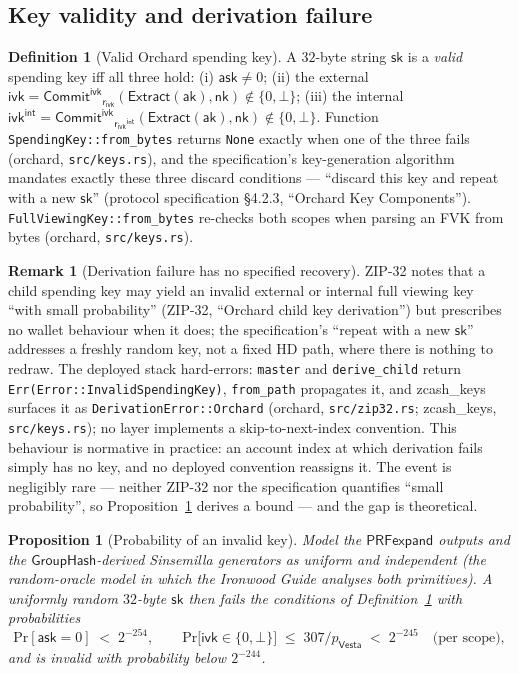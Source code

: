 \documentclass[11pt,a4paper]{article}
\newtheorem{proposition}[theorem]{Proposition}
\theoremstyle{definition}
\newtheorem{definition}[theorem]{Definition}
\newtheorem{remark}[theorem]{Remark}
\renewcommand{\Pr}{\mathrm{Pr}}
\newcommand{\Vesta}{\ensuremath{\mathsf{Vesta}}}
\newcommand{\CommitIvk}{\ensuremath{\mathsf{Commit}^{\mathsf{ivk}}}}
\newcommand{\Extract}{\ensuremath{\mathsf{Extract}}}
\newcommand{\GroupHash}{\ensuremath{\mathsf{GroupHash}}}
\newcommand{\ask}{\ensuremath{\mathsf{ask}}}
\newcommand{\aksym}{\ensuremath{\mathsf{ak}}}
\newcommand{\nksym}{\ensuremath{\mathsf{nk}}}
\newcommand{\ivk}{\ensuremath{\mathsf{ivk}}}
\newcommand{\rivk}{\ensuremath{\mathsf{r_{ivk}}}}
\begin{document}
\subsection{Key validity and derivation failure}\label{sec:zip32-invalid}

\begin{definition}[Valid Orchard spending key]\label{def:zip32-validity}
A $32$-byte string $\mathsf{sk}$ is a \emph{valid} spending key iff all
three hold: (i) $\ask \ne 0$; (ii) the external
$\ivk = \CommitIvk_{\rivk}(\Extract(\aksym), \nksym) \notin \{0, \bot\}$;
(iii) the internal
$\ivk^{\mathsf{int}} = \CommitIvk_{\rivk^{\mathsf{int}}}(\Extract(\aksym),
\nksym) \notin \{0, \bot\}$. Function \texttt{SpendingKey::from\_bytes}
returns \texttt{None} exactly when one of the three fails
(\textsf{orchard}, \texttt{src/keys.rs}), and the specification's
key-generation algorithm mandates exactly these three discard conditions
--- ``discard this key and repeat with a new $\mathsf{sk}$'' (protocol
specification \S4.2.3, ``Orchard Key Components'').
\texttt{FullViewingKey::from\_bytes} re-checks both scopes when parsing an
FVK from bytes (\textsf{orchard}, \texttt{src/keys.rs}).
\end{definition}

\begin{remark}[Derivation failure has no specified recovery]
ZIP-32 notes that a child spending key may yield an invalid external or
internal full viewing key ``with small probability'' (ZIP-32, ``Orchard
child key derivation'') but prescribes no wallet behaviour when it does;
the specification's ``repeat with a new $\mathsf{sk}$'' addresses a freshly
random key, not a fixed HD path, where there is nothing to redraw. The
deployed stack hard-errors: \texttt{master} and \texttt{derive\_child}
return \texttt{Err(Error::InvalidSpendingKey)},
\texttt{from\_path} propagates it, and \textsf{zcash\_keys} surfaces it as
\texttt{DerivationError::Orchard} (\textsf{orchard}, \texttt{src/zip32.rs};
\textsf{zcash\_keys}, \texttt{src/keys.rs}); no layer implements a
skip-to-next-index convention. This behaviour is normative in practice: an
account index at which derivation fails simply has no key, and no deployed
convention reassigns it. The event is negligibly rare --- neither ZIP-32
nor the specification quantifies ``small probability'', so
Proposition~\ref{prop:zip32-invalid} derives a bound --- and the gap is
theoretical.
\end{remark}

\begin{proposition}[Probability of an invalid key]\label{prop:zip32-invalid}
Model the $\mathsf{PRFexpand}$ outputs and the $\GroupHash$-derived
Sinsemilla generators as uniform and independent (the random-oracle model
in which the \emph{Ironwood Guide} analyses both primitives). A uniformly
random $32$-byte $\mathsf{sk}$ then fails the conditions of
Definition~\ref{def:zip32-validity} with probabilities
\[
\Pr[\ask = 0] \;<\; 2^{-254}, \qquad
\Pr\bigl[\ivk \in \{0, \bot\}\bigr] \;\le\; 307/p_{\Vesta} \;<\; 2^{-245}
\quad \text{(per scope)},
\]
and is invalid with probability below $2^{-244}$.
\end{proposition}
\end{document}
